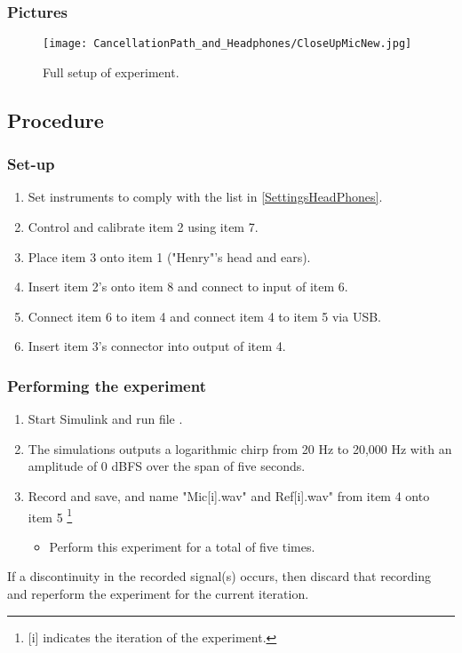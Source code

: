 \subsubsection{Pictures}
\begin{figure}[H]
	\centering
	\texttt{[image: CancellationPath\_and\_Headphones/CloseUpMicNew.jpg]}
	\caption{Full setup of experiment.}
	\label{CloseupHeadphone}
\end{figure}


\subsection{Procedure}
\subsubsection{Set-up}
\begin{enumerate}
	\item Set instruments to comply with the list in \ref{SettingsHeadPhones}.
	\item Control and calibrate item 2 using item 7.
	\item Place item 3 onto item 1 ("Henry"'s head and ears).
	\item Insert item 2's onto item 8 and connect to input of item 6.
	\item Connect item 6 to item 4 and connect item 4 to item 5 via USB.
	\item Insert item 3's connector into output of item 4.
\end{enumerate}

\subsubsection{Performing the experiment}
\begin{enumerate}
	\item Start Simulink \textsuperscript{\textregistered} and run file  .
	\item The simulations outputs a logarithmic chirp from 20 Hz to 20,000 Hz with an amplitude of 0 dBFS over the span of five seconds.
	\item Record and save, and name "Mic[i].wav" and Ref[i].wav" from item 4 onto item 5 \footnote{[i] indicates the iteration of the experiment.}
	\begin{itemize}
		\item[] Perform this experiment for a total of five times.
	\end{itemize}
\end{enumerate}
If  a discontinuity in the recorded signal(s) occurs, then discard that recording and reperform the experiment for the current iteration.

